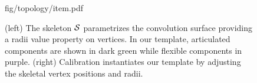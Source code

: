 \begin{figure}[t!]
\centering
\begin{overpic} 
[width=\linewidth]
{fig/topology/item.pdf}
\end{overpic}
\caption{
% 
% 
(left) The skeleton $\mathcal{S}$ parametrizes the convolution surface providing a radii value property on vertices. 
In our template, articulated components are shown in {\color{darkgreen} dark green} while flexible components in {\color{purple}purple}.
% 
(right) Calibration instantiates our template by adjusting the skeletal vertex positions and radii. 
% 
% 
}
\label{fig:topology}
\end{figure}